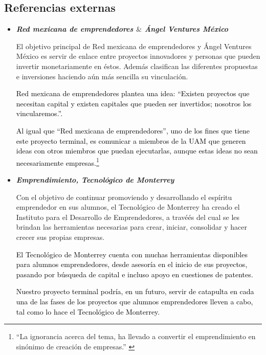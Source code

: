 \documentclass[11pt,letterpaper,titlepage]{article}
\begin{document}
\subsection{Referencias externas}
\begin{itemize}
\item \textit{\textbf{Red mexicana de emprendedores $\&$  \'Angel Ventures M\'exico}}

El objetivo principal de Red mexicana de emprendedores\cite{redmexicana} y  \'Angel Ventures M\'exico\cite{angel} es servir de enlace entre proyectos innovadores y personas que pueden invertir monetariamente en \'estos. Adem\'as clasifican las diferentes propuestas e inversiones haciendo a\'un m\'as sencilla su vinculaci\'on.

\textcolor{black}{Red mexicana de emprendedores plantea una idea: ``Existen proyectos que necesitan capital y existen capitales que pueden ser invertidos; nosotros los vincularemos.''. }


\textcolor{black}{Al igual que ``Red mexicana de emprendedores'', uno de los fines que tiene este proyecto terminal, es comunicar a miembros de la UAM que generen ideas con otros miembros que puedan ejecutarlas, aunque estas ideas no sean necesariamente empresas.\footnote{``La ignorancia acerca del tema, ha llevado a convertir el emprendimiento en sin\'onimo de creaci\'on de empresas.'' \cite{desarrollo}}}

\item \textit{\textbf{Emprendimiento, Tecnol\'ogico de Monterrey}}

Con el objetivo de continuar promoviendo y desarrollando el esp\'iritu emprendedor en sus alumnos, el Tecnol\'ogico de Monterrey ha creado el Instituto para el Desarrollo de Emprendedores\cite{itam}, a travé\'es del cual se les brindan las herramientas necesarias para crear, iniciar, consolidar y hacer crecer sus propias empresas. 

\textcolor{black}{El Tecnol\'ogico de Monterrey cuenta con muchas herramientas disponibles para alumnos emprendedores, desde asesor\'ia en el inicio de sus proyectos, pasando por b\'usqueda de capital e incluso apoyo en cuestiones de patentes.}

\textcolor{black}{Nuestro proyecto terminal podr\'ia, en un futuro, servir de catapulta en cada una de las fases de los proyectos que alumnos emprendedores lleven a cabo, tal como lo hace el Tecnol\'ogico de Monterrey.}




\end{itemize}
\end{document}
